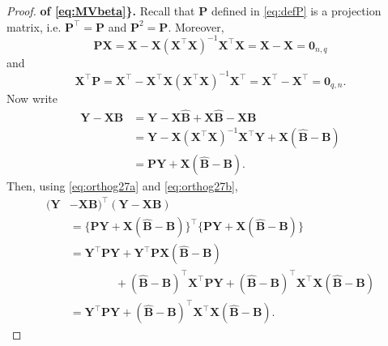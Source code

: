 \documentclass[]{book}
\theoremstyle{definition}
\theoremstyle{definition}
\theoremstyle{definition}
\theoremstyle{remark}
\begin{document}
\begin{proof}
{}\textbf{of \eqref{eq:MVbeta}\}.} Recall that \(\boldsymbol P\) defined in \eqref{eq:defP} is a projection matrix, i.e. \(\boldsymbol P^\top =\boldsymbol P\) and \(\boldsymbol P^2 = \boldsymbol P\).
Moreover,
\begin{equation}
\boldsymbol P\boldsymbol X=\boldsymbol X-\boldsymbol X(\boldsymbol X^\top \boldsymbol X)^{-1}\boldsymbol X^\top \boldsymbol X=\boldsymbol X-\boldsymbol X={\mathbf 0}_{n,q}
\label{eq:orthog27a}
\end{equation}
and
\begin{equation}
\boldsymbol X^\top \boldsymbol P=\boldsymbol X^\top - \boldsymbol X^\top \boldsymbol X(\boldsymbol X^\top \boldsymbol X)^{-1}\boldsymbol X^\top =\boldsymbol X^\top -\boldsymbol X^\top ={\mathbf 0}_{q,n}.
\label{eq:orthog27b}
\end{equation}
Now write
\begin{align*}
\boldsymbol Y-\boldsymbol X\boldsymbol B&=\boldsymbol Y-\boldsymbol X\hat{\boldsymbol B} +\boldsymbol X\hat{\boldsymbol B}-\boldsymbol X\boldsymbol B\\
&=\boldsymbol Y-\boldsymbol X(\boldsymbol X^\top \boldsymbol X)^{-1}\boldsymbol X^\top \boldsymbol Y+\boldsymbol X(\hat{\boldsymbol B}-\boldsymbol B)\\
&=\boldsymbol P\boldsymbol Y+\boldsymbol X(\hat{\boldsymbol B}-\boldsymbol B).
\end{align*}
Then, using \eqref{eq:orthog27a} and \eqref{eq:orthog27b},
\begin{align}
(\boldsymbol Y&- \boldsymbol X\boldsymbol B)^\top (\boldsymbol Y- \boldsymbol X\boldsymbol B) \nonumber \\
&=\{\boldsymbol P\boldsymbol Y+ \boldsymbol X(\hat{\boldsymbol B}-\boldsymbol B)\}^\top \{\boldsymbol P\boldsymbol Y+\boldsymbol X(\hat{\boldsymbol B}-\boldsymbol B)\}\nonumber \\
&=\boldsymbol Y^\top \boldsymbol P\boldsymbol Y+ \boldsymbol Y^\top \boldsymbol P\boldsymbol X(\hat{\boldsymbol B}-\boldsymbol B)\nonumber \\
& \qquad \qquad + (\hat{\boldsymbol B}-\boldsymbol B)^\top \boldsymbol X^\top \boldsymbol P\boldsymbol Y+(\hat{\boldsymbol B}-\boldsymbol B)^\top \boldsymbol X^\top \boldsymbol X(\hat{\boldsymbol B}-\boldsymbol B)
\nonumber\\
&=\boldsymbol Y^\top \boldsymbol P\boldsymbol Y+ (\hat{\boldsymbol B}-\boldsymbol B)^\top \boldsymbol X^\top \boldsymbol X(\hat{\boldsymbol B}-\boldsymbol B).

\end{align}
\end{proof}
\end{document}

